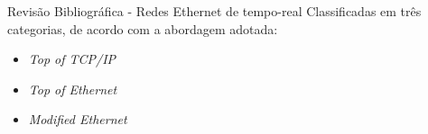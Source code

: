 \begin{frame}{Revis\~{a}o Bibliogr\'{a}fica - Redes Ethernet de tempo-real}
	Classificadas em tr\^{e}s categorias, de acordo com a abordagem adotada:
	\begin{itemize}
		\item \emph{Top of TCP/IP} %
		\item \emph{Top of Ethernet} %
		\item \emph{Modified Ethernet} %
	\end{itemize}
\end{frame}